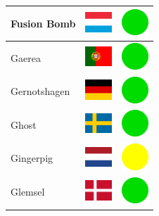\documentclass[12pt, a4paper, twoside]{report}
\begin{document}
\begin{center}
\begin{longtable}{|p{5cm}|p{2cm}|p{2cm}|}
 Fusion Bomb                                                & \includegraphics[width=1cm]{../4x3/lu} &   \includegraphics[width=1cm]{../likes/y} \\ \hline
 Gaerea                                                     & \includegraphics[width=1cm]{../4x3/pt} &   \includegraphics[width=1cm]{../likes/y} \\ \hline
 Gernotshagen                                               & \includegraphics[width=1cm]{../4x3/de} &   \includegraphics[width=1cm]{../likes/y} \\ \hline
 Ghost                                                      & \includegraphics[width=1cm]{../4x3/se} &   \includegraphics[width=1cm]{../likes/y} \\ \hline
 Gingerpig                                                  & \includegraphics[width=1cm]{../4x3/nl} &   \includegraphics[width=1cm]{../likes/m} \\ \hline
 Glemsel                                                    & \includegraphics[width=1cm]{../4x3/dk} &   \includegraphics[width=1cm]{../likes/y} \\ \hline

\end{longtable}
\end{center}
\end{document}
